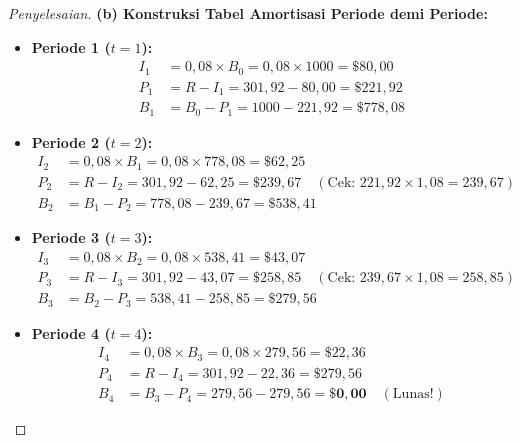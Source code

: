 \documentclass[11pt,a4paper]{article}
\begin{document}
\begin{proof}[Penyelesaian]
\vspace{0.8em}
\noindent\textbf{(b) Konstruksi Tabel Amortisasi Periode demi Periode:}\\[0.3em]
\begin{itemize}
    \item \textbf{Periode 1 ($t=1$):}
    \begin{align*}
        I_1 &= 0{,}08 \times B_0 = 0{,}08 \times 1000 = \$80{,}00 \\
        P_1 &= R - I_1 = 301{,}92 - 80{,}00 = \$221{,}92 \\
        B_1 &= B_0 - P_1 = 1000 - 221{,}92 = \$778{,}08
    \end{align*}
    \item \textbf{Periode 2 ($t=2$):}
    \begin{align*}
        I_2 &= 0{,}08 \times B_1 = 0{,}08 \times 778{,}08 = \$62{,}25 \\
        P_2 &= R - I_2 = 301{,}92 - 62{,}25 = \$239{,}67 \quad (\text{Cek: } 221{,}92 \times 1{,}08 = 239{,}67) \\
        B_2 &= B_1 - P_2 = 778{,}08 - 239{,}67 = \$538{,}41
    \end{align*}
    \item \textbf{Periode 3 ($t=3$):}
    \begin{align*}
        I_3 &= 0{,}08 \times B_2 = 0{,}08 \times 538{,}41 = \$43{,}07 \\
        P_3 &= R - I_3 = 301{,}92 - 43{,}07 = \$258{,}85 \quad (\text{Cek: } 239{,}67 \times 1{,}08 = 258{,}85) \\
        B_3 &= B_2 - P_3 = 538{,}41 - 258{,}85 = \$279{,}56
    \end{align*}
    \item \textbf{Periode 4 ($t=4$):}
    \begin{align*}
        I_4 &= 0{,}08 \times B_3 = 0{,}08 \times 279{,}56 = \$22{,}36 \\
        P_4 &= R - I_4 = 301{,}92 - 22{,}36 = \$279{,}56 \\
        B_4 &= B_3 - P_4 = 279{,}56 - 279{,}56 = \mathbf{\$0{,}00} \quad (\text{Lunas!})
    \end{align*}
\end{itemize}


\end{proof}
\end{document}

